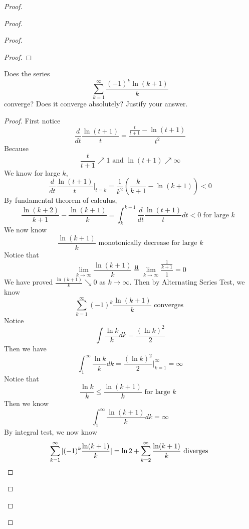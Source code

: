 \documentclass{report}
\begin{document}
\begin{proof}
\begin{proof}
\begin{proof}
\begin{proof}
\end{proof}

\begin{question}{}{}
Does the series
\[
\sum_{k=1}^{\infty} \frac{(-1)^k \ln(k + 1)}{k}
\]
converge? Does it converge absolutely? Justify your answer.
\end{question}
\begin{proof}
First notice
\begin{equation}
\frac{d}{dt}\frac{\ln (t+1)}{t} =\frac{\frac{t}{t+1}- \ln (t+1)}{t^2}
\end{equation}
Because 
\begin{equation}
\frac{t}{t+1}\nearrow 1 \text{ and }\ln (t+1)\nearrow \infty
\end{equation}
We know for large $k$, 
\begin{equation}
\frac{d}{dt}\frac{\ln (t+1)}{t} \bigg|_{t=k} =\frac{1}{k^2}(\frac{k}{k+1}-\ln (k+1))<0
\end{equation}
By fundamental theorem of calculus, 
\begin{equation}
\frac{\ln (k+2)}{k+1}-\frac{\ln (k+1)}{k}=\int_{k}^{k+1} \frac{d}{dt} \frac{\ln (t+1)}{t}dt<0\text{ for large $k$ }
\end{equation}
We now know 
\begin{equation}
\frac{\ln (k+1)}{k}\text{ monotonically decrease for large $k$}
\end{equation}
Notice that 
\begin{equation}
\lim_{k\to\infty} \frac{\ln (k+1)}{k}\stackrel{\mathrm{H}}{=}\lim_{k\to\infty} \frac{\frac{1}{k+1}}{1}=0
\end{equation}
We have proved $\frac{\ln (k+1)}{k}\searrow 0$ as $k\to\infty$. Then by Alternating Series Test, we know 
\begin{equation}
\sum_{k=1}^\infty (-1)^k \frac{\ln (k+1)}{k}\text{ converges }
\end{equation}
Notice 
\begin{equation}
\int \frac{\ln k}{k}dk=\frac{(\ln k)^2}{2}
\end{equation}
Then we have
\begin{equation}
\int_{1}^\infty \frac{\ln k}{k}dk= \frac{(\ln k)^2}{2}\bigg|_{k=1}^\infty =\infty 
\end{equation}
Notice that 
\begin{equation}
\frac{\ln k}{k}\leq \frac{\ln (k+1)}{k}\text{ for large $k$ }
\end{equation}
Then we know
\begin{equation}
\int_1^\infty \frac{\ln (k+1)}{k}dk =\infty
\end{equation}
By integral test, we now know 
\begin{equation}
\sum_{k=1}^\infty |(-1)^k \frac{\ln (k+1)}{k}|=\ln 2+\sum_{k=2}^\infty \frac{\ln (k+1)}{k}\text{ diverges }
\end{equation}



\end{proof}
\end{proof}
\end{proof}
\end{proof}
\end{document}
